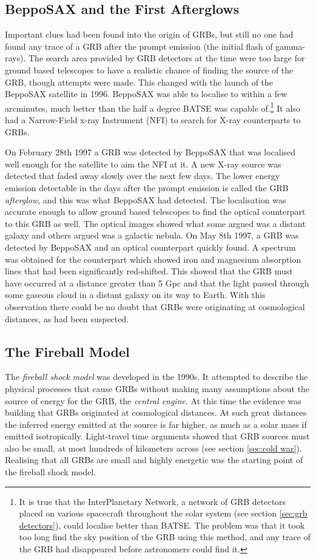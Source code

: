 \documentclass[11pt]{cuthesis}
\begin{document}
\subsection{BeppoSAX and the First Afterglows}
Important clues had been found into the origin of GRBs, but still no one had found any trace of a GRB after the prompt emission (the initial flash of gamma-rays). The search area provided by GRB detectors at the time were too large for ground based telescopes to have a realistic chance of finding the source of the GRB, though attempts were made. This changed with the launch of the BeppoSAX satellite in 1996. BeppoSAX was able to localise to within a few arcminutes, much better than the half a degree BATSE was capable of.\footnote{It is true that the InterPlanetary Network, a network of GRB detectors placed on various spacecraft throughout the solar system (see section \ref{sec:grb detectors}), could localise better than BATSE. The problem was that it took too long find the sky position of the GRB using this method, and any trace of the GRB had disappeared before astronomers could find it.} It also had a Narrow-Field x-ray Instrument (NFI) to search for X-ray counterparts to GRBs.

On February 28th 1997 a GRB was detected by BeppoSAX that was localised well enough for the satellite to aim the NFI at it. A new X-ray source was detected that faded away slowly over the next few days. The lower energy emission detectable in the days after the prompt emission is called the GRB \textit{afterglow}, and this was what BeppoSAX had detected. The localisation was accurate enough to allow ground based telescopes to find the optical counterpart to this GRB as well. The optical images showed what some argued was a distant galaxy and others argued was a galactic nebula. On May 8th 1997, a GRB was detected by BeppoSAX and an optical counterpart quickly found. A spectrum was obtained for the counterpart which showed iron and magnesium absorption lines that had been significantly red-shifted. This showed that the GRB must have occurred at a distance greater than 5 Gpc and that the light passed through some gaseous cloud in a distant galaxy on its way to Earth. With this observation there could be no doubt that GRBs were originating at cosmological distances, as had been suspected.  

\subsection{The Fireball Model} \label{sec: fireball}
The \textit{fireball shock model} was developed in the 1990s. It attempted to describe the physical processes that cause GRBs without making many assumptions about the source of energy for the GRB, the \textit{central engine}. At this time the evidence was building that GRBs originated at cosmological distances. At such great distances the inferred energy emitted at the source is far higher, as much as a solar mass if emitted isotropically. Light-travel time arguments showed that GRB sources must also be small, at most hundreds of kilometers across (see section \ref{sec:cold war}). Realising that all GRBs are small and highly energetic was the starting point of the fireball shock model.
\end{document}
